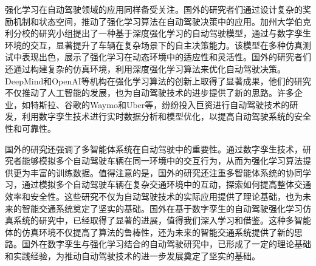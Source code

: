 强化学习在自动驾驶领域的应用同样备受关注。国外的研究者们通过设计复杂的奖励机制和状态空间，推动了强化学习算法在自动驾驶决策中的应用。加州大学伯克利分校的研究小组提出了一种基于深度强化学习的自动驾驶模型，通过与数字孪生环境的交互，显著提升了车辆在复杂场景下的自主决策能力。该模型在多种仿真测试中表现出色，展示了强化学习在动态环境中的适应性和灵活性。国外的研究者们还通过构建复杂的仿真环境，利用深度强化学习算法来优化自动驾驶决策。DeepMind和OpenAI等机构在强化学习算法的创新上取得了显著成果，他们的研究不仅推动了人工智能的发展，也为自动驾驶技术的进步提供了新的思路。许多企业，如特斯拉、谷歌的Waymo和Uber等，纷纷投入巨资进行自动驾驶技术的研发，利用数字孪生技术进行实时数据分析和模型优化，以提高自动驾驶系统的安全性和可靠性。


国外的研究还强调了多智能体系统在自动驾驶中的重要性。通过数字孪生技术，研究者能够模拟多个自动驾驶车辆在同一环境中的交互行为，从而为强化学习算法提供更为丰富的训练数据。值得注意的是，国外的研究还注重多智能体系统的协同学习，通过模拟多个自动驾驶车辆在复杂交通环境中的互动，探索如何提高整体交通效率和安全性。这些研究不仅为自动驾驶技术的实际应用提供了理论基础，也为未来的智能交通系统奠定了坚实的基础。国外在基于数字孪生的自动驾驶强化学习仿真系统的研究中，已经取得了显著的进展，值得我们深入学习和借鉴。这种多智能体的仿真环境不仅提高了算法的鲁棒性，还为未来的智能交通系统提供了新的思路。国外在数字孪生与强化学习结合的自动驾驶研究中，已形成了一定的理论基础和实践经验，为推动自动驾驶技术的进一步发展奠定了坚实的基础。





\begin{tabular}{l l}
\end{tabular}


